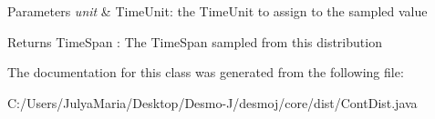 \begin{DoxyParams}{Parameters}
{\em unit} & Time\-Unit\-: the Time\-Unit to assign to the sampled value\\
\hline
\end{DoxyParams}
\begin{DoxyReturn}{Returns}
Time\-Span \-: The Time\-Span sampled from this distribution 
\end{DoxyReturn}


The documentation for this class was generated from the following file\-:\begin{DoxyCompactItemize}
\item 
C\-:/\-Users/\-Julya\-Maria/\-Desktop/\-Desmo-\/\-J/desmoj/core/dist/Cont\-Dist.\-java\end{DoxyCompactItemize}

